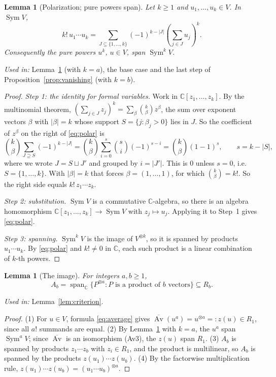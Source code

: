 \documentclass[11pt]{article}
\newtheorem{lemma}[theorem]{Lemma}
\theoremstyle{remark}
\DeclareMathOperator{\Sym}{Sym}
\DeclareMathOperator{\Av}{Av}
\newcommand{\C}{\mathbb C}
\begin{document}
\begin{lemma}[Polarization; pure powers span]\label{lem:powers}
Let $k\ge1$ and $u_1,\dots,u_k\in V$. In $\Sym V$,
\begin{equation}\label{eq:polar}
 k!\,u_1\cdots u_k
 =\sum_{J\subseteq\{1,\ldots,k\}}(-1)^{k-|J|}
   \left(\sum_{j\in J}u_j\right)^k .
\end{equation}
Consequently the pure powers $u^k$, $u\in V$, span $\Sym^kV$.
\end{lemma}

\noindent\emph{Used in:} Lemma~\ref{lem:image} (with $k=a$), the base case
and the last step of Proposition~\ref{prop:vanishing} (with $k=b$).

\begin{proof}
\emph{Step 1: the identity for formal variables.} Work in
$\C[z_1,\dots,z_k]$. By the multinomial theorem,
$(\sum_{j\in J}z_j)^k=\sum_\beta\binom{k}{\beta}z^\beta$, the sum over
exponent vectors $\beta$ with $|\beta|=k$ whose support
$S=\{j:\beta_j>0\}$ lies in $J$. So the coefficient of $z^\beta$ on the
right of \eqref{eq:polar} is
\[
 \binom{k}{\beta}\sum_{J\supseteq S}(-1)^{k-|J|}
 =\binom{k}{\beta}\sum_{i=0}^{s}\binom{s}{i}(-1)^{s-i}
 =\binom{k}{\beta}(1-1)^{s},\qquad s=k-|S|,
\]
where we wrote $J=S\sqcup J'$ and grouped by $i=|J'|$. This is $0$ unless
$s=0$, i.e.\ $S=\{1,\dots,k\}$. With $|\beta|=k$ that forces
$\beta=(1,\dots,1)$, for which $\binom{k}{\beta}=k!$. So the right side
equals $k!\,z_1\cdots z_k$.

\emph{Step 2: substitution.} $\Sym V$ is a commutative $\C$-algebra, so
there is an algebra homomorphism $\C[z_1,\dots,z_k]\to\Sym V$ with
$z_j\mapsto u_j$. Applying it to Step~1 gives \eqref{eq:polar}.

\emph{Step 3: spanning.} $\Sym^kV$ is the image of $V^{\otimes k}$, so it is
spanned by products $u_1\cdots u_k$. By \eqref{eq:polar} and $k!\ne0$ in
$\C$, each such product is a linear combination of $k$-th powers.
\end{proof}

\begin{lemma}[The image]\label{lem:image}
For integers $a,b\ge1$,
\[
 A_b=\operatorname{span}_{\C}
 \{P^{\otimes a}: P\text{ is a product of }b\text{ vectors}\}
 \subseteq R_b .
\]
\end{lemma}

\noindent\emph{Used in:} Lemma~\ref{lem:criterion}.

\begin{proof}
(1) For $u\in V$, formula \eqref{eq:average} gives
$\overline{\Av}(u^a)=u^{\otimes a}=:z(u)\in R_1$, since all $a!$ summands
are equal.
(2) By Lemma~\ref{lem:powers} with $k=a$, the $u^a$ span $\Sym^aV$; since
$\overline{\Av}$ is an isomorphism (Av3), the $z(u)$ span $R_1$.
(3) $A_b$ is spanned by products $z_1\cdots z_b$ with $z_i\in R_1$, and the
product is multilinear, so $A_b$ is spanned by the products
$z(u_1)\cdots z(u_b)$.
(4) By the factorwise multiplication rule,
$z(u_1)\cdots z(u_b)=(u_1\cdots u_b)^{\otimes a}$.
\end{proof}
\end{document}
